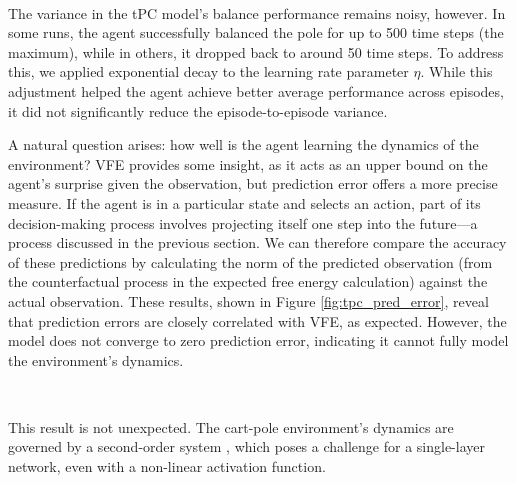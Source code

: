 \documentclass{article}
\begin{document}
\

The variance in the tPC model's balance performance remains noisy, however. In some runs, the agent successfully balanced the pole for up to 500 time steps (the maximum), while in others, it dropped back to around 50 time steps. To address this, we applied exponential decay to the learning rate parameter $\eta$. While this adjustment helped the agent achieve better average performance across episodes, it did not significantly reduce the episode-to-episode variance.
\

A natural question arises: how well is the agent learning the dynamics of the environment? VFE provides some insight, as it acts as an upper bound on the agent's surprise given the observation, but prediction error offers a more precise measure. If the agent is in a particular state and selects an action, part of its decision-making process involves projecting itself one step into the future—a process discussed in the previous section. We can therefore compare the accuracy of these predictions by calculating the norm of the predicted observation (from the counterfactual process in the expected free energy calculation) against the actual observation. These results, shown in Figure \ref{fig:tpc_pred_error}, reveal that prediction errors are closely correlated with VFE, as expected. However, the model does not converge to zero prediction error, indicating it cannot fully model the environment’s dynamics.

\

This result is not unexpected. The cart-pole environment’s dynamics are governed by a second-order system \citep{florian2005CorrectEF}, which poses a challenge for a single-layer network, even with a non-linear activation function.
\end{document}
